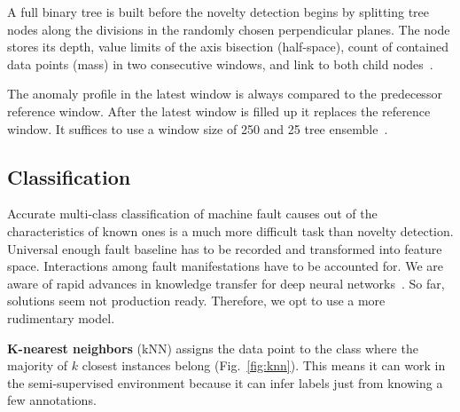 A full binary tree is built before the novelty detection begins by splitting tree nodes along the divisions in the randomly chosen perpendicular planes. The node stores its depth, value limits of the axis bisection (half-space), count of contained data points (mass) in two consecutive windows, and link to both child nodes~\cite{tan_fast_2011}. 

The anomaly profile in the latest window is always compared to the predecessor reference window. After the latest window is filled up it replaces the reference window. It suffices to use a window size of 250 and 25 tree ensemble~\cite{tan_fast_2011}.

\subsection{Classification}
Accurate multi-class classification of machine fault causes out of the characteristics of known ones is a much more difficult task than novelty detection. Universal enough fault baseline has to be recorded and transformed into feature space. Interactions among fault manifestations have to be accounted for. We are aware of rapid advances in knowledge transfer for deep neural networks~\cite{maurya_condition-based_2021}. So far, solutions seem not production ready. Therefore, we opt to use a more rudimentary model.
\bigbreak

\textbf{K-nearest neighbors} (kNN) assigns the data point to the class where the majority of $k$ closest instances belong (Fig.~\ref{fig:knn}). This means it can work in the semi-supervised environment because it can infer labels just from knowing a few annotations.

